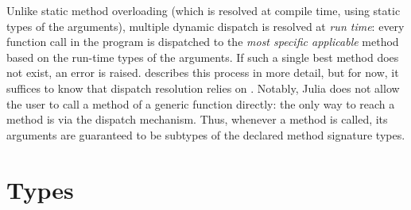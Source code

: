 Unlike static %
method overloading (which is resolved at compile time, using static types of
the arguments), multiple dynamic dispatch is resolved at \emph{run time}:
every function call in the program is dispatched to the
\emph{most specific applicable} method based on the run-time
types of the arguments. If such a single best method does not exist,
an error is raised.
 describes this process in more detail, but for now,
it suffices to know that dispatch resolution relies on .
Notably, Julia does not allow the user to call a method of a generic function
directly: the only way to reach a method is via the dispatch mechanism.
Thus, whenever a method is called, its arguments are guaranteed to be
subtypes of the declared method signature types.

\section{Types}\label{sec:background:types-overview}

